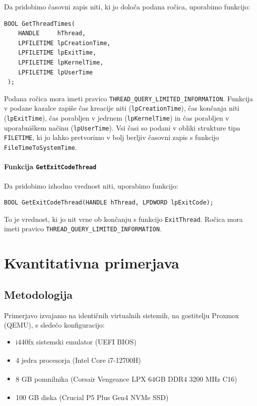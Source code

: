 \documentclass[a4paper,12pt,openright]{book}
\begin{document}
Da pridobimo časovni zapis niti, ki jo določa podana ročica, uporabimo funkcijo:
\begin{lstlisting}[style=func]
 BOOL GetThreadTimes(
	HANDLE     hThread,
	LPFILETIME lpCreationTime,
	LPFILETIME lpExitTime,
	LPFILETIME lpKernelTime,
	LPFILETIME lpUserTime
 );
\end{lstlisting}

Podana ročica mora imeti pravico \texttt{THREAD\_QUERY\_LIMITED\_INFORMATION}.
Funkcija v podane kazalce zapiše čas kreacije niti (\texttt{lpCreationTime}), čas končanja niti (\texttt{lpExitTime}), čas porabljen v jedrnem (\texttt{lpKernelTime}) in čas porabljen v uporabniškem načinu (\texttt{lpUserTime}).
Vsi časi so podani v obliki strukture tipa \texttt{FILETIME}, ki jo lahko pretvorimo v bolj berljiv časovni zapis s funkcijo \texttt{FileTimeToSystemTime}.

\subsubsection{Funkcija \texttt{GetExitCodeThread}}

Da pridobimo izhodno vrednost niti, uporabimo funkcijo:
\begin{lstlisting}[style=func]
 BOOL GetExitCodeThread(HANDLE hThread, LPDWORD lpExitCode);
\end{lstlisting}
To je vrednost, ki jo nit vrne ob končanju s funkcijo \texttt{ExitThread}.
Ročica mora imeti pravico \texttt{THREAD\_QUERY\_LIMITED\_INFORMATION}.

\chapter{Kvantitativna primerjava}

\section{Metodologija}

Primerjavo izvajamo na identičnih virtualnih sistemih, na gostitelju Proxmox (QEMU), s sledečo konfiguracijo:
\begin{itemize}
	\item i440fx sistemski emulator (UEFI BIOS)
	\item 4 jedra procesorja (Intel\textsuperscript{\textregistered} Core\textsuperscript{\texttrademark} i7-12700H)
	\item 8 GB pomnilnika (Corsair\textsuperscript{\textregistered} Vengeance\textsuperscript{\textregistered} LPX 64GB DDR4 3200 MHz C16)
	\item 100 GB diska (Crucial\textsuperscript{\textregistered} P5 Plus Gen4 NVMe SSD)
\end{itemize}
\end{document}
